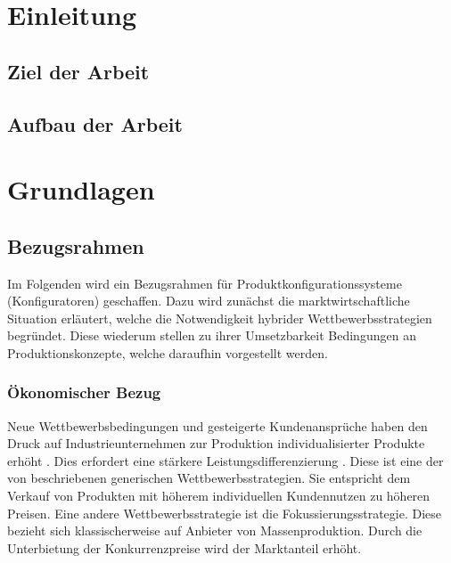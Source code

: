 \documentclass[12pt,a4paper,bibliography=totocnumbered,listof=totoc]{scrartcl}
\begin{document}













\section{Einleitung}

\subsection{Ziel der Arbeit}

\subsection{Aufbau der Arbeit}

\pagebreak

\section{Grundlagen}

\subsection{Bezugsrahmen}
Im Folgenden wird ein Bezugsrahmen für Produktkonfigurationssysteme (Konfiguratoren) geschaffen. Dazu wird zunächst die marktwirtschaftliche Situation erläutert, welche die Notwendigkeit hybrider Wettbewerbsstrategien begründet. Diese wiederum stellen zu ihrer Umsetzbarkeit Bedingungen an Produktionskonzepte, welche daraufhin vorgestellt werden.

\subsubsection{Ökonomischer Bezug}
\label{subsubsection:oekonomischerBezug}
Neue Wettbewerbsbedingungen und gesteigerte Kundenansprüche haben den Druck auf Industrieunternehmen zur Produktion individualisierter Produkte erhöht \citep{piller98}. Dies erfordert eine stärkere Leistungsdifferenzierung \citep{lutz11}. Diese ist eine der von \citeauthor{porter02} beschriebenen \glqq generischen Wettbewerbsstrategien\grqq{}. Sie entspricht dem Verkauf von Produkten mit höherem individuellen Kundennutzen zu höheren Preisen. Eine andere Wettbewerbsstrategie ist die  Fokussierungsstrategie. Diese bezieht sich klassischerweise auf Anbieter von Massenproduktion. Durch die Unterbietung der Konkurrenzpreise wird der Marktanteil erhöht. 
\end{document}
